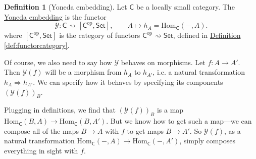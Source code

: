 \documentclass[a4paper,10pt]{scrreprt}
\newcommand{\defn}[1]{\ul{#1}}
\newcommand{\Hom}{\mathrm{Hom}}
\theoremstyle{definition}
\newtheorem{definition}{Definition}[section]
\theoremstyle{plain}
\theoremstyle{remark}
\begin{document}
\begin{definition}[Yoneda embedding]
  \label{def:yonedaembedding}
  Let $\mathsf{C}$ be a locally small category. The \defn{Yoneda embedding} is the functor
  \begin{equation*}
    \mathcal{Y}\colon \mathsf{C} \rightsquigarrow [\mathsf{C}^{\mathrm{op}}, \mathsf{Set}], \qquad A \mapsto h_{A} = \Hom_{\mathsf{C}}(-, A).
  \end{equation*}
  where $[\mathsf{C}^{\mathrm{op}}, \mathsf{Set}]$ is the category of functors $\mathsf{C}^{\mathrm{op}} \rightsquigarrow \mathsf{Set}$, defined in \hyperref[def:functorcategory]{Definition \ref*{def:functorcategory}}.

  Of course, we also need to say how $\mathcal{Y}$ behaves on morphisms. Let $f\colon A \to A'$. Then $\mathcal{Y}(f)$ will be a morphism from $h_{A}$ to $h_{A'}$, i.e. a natural transformation $h_{A} \Rightarrow h_{A'}$. We can specify how it behaves by specifying its components $(\mathcal{Y}(f))_{B}$. 

  Plugging in definitions, we find that $(\mathcal{Y}(f))_{B}$ is a map $\Hom_{\mathsf{C}}(B, A) \to \Hom_{\mathsf{C}}(B, A')$. But we know how to get such a map---we can compose all of the maps $B \to A$ with $f$ to get maps $B \to A'$. So $\mathcal{Y}(f)$, as a natural transformation $\Hom_{\mathsf{C}}(-, A) \to \Hom_{\mathsf{C}}(-, A')$, simply composes everything in sight with $f$.
\end{definition}
\end{document}
